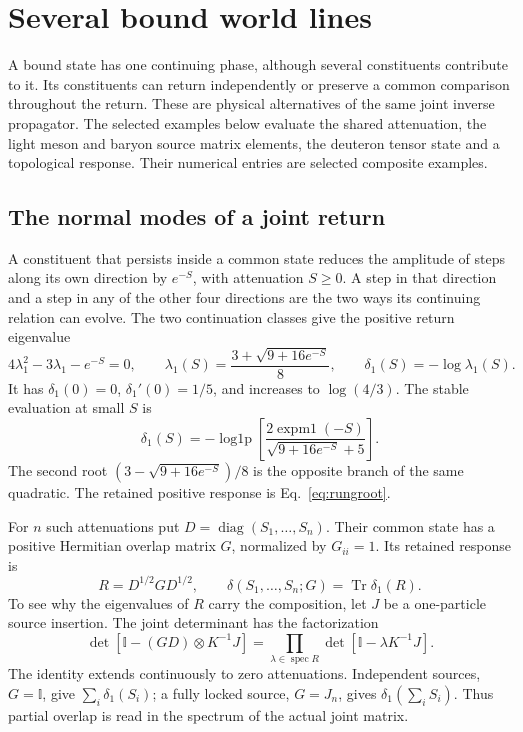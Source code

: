 \documentclass[aps,prx,onecolumn,10pt,notitlepage,nofootinbib,longbibliography]{revtex4-2}
\numberwithin{equation}{section}
\numberwithin{table}{section}
\newcommand{\Id}{\mathbb I}
\newcommand{\Tr}{\operatorname{Tr}}
\newcommand{\diag}{\operatorname{diag}}
\begin{document}
\section{Several bound world lines}
\label{sec:many}


A bound state has one continuing phase, although several constituents contribute to it. Its constituents can return independently or preserve a common comparison throughout the return. These are physical alternatives of the same joint inverse propagator. The selected examples below evaluate the shared attenuation, the light meson and baryon source matrix elements, the deuteron tensor state and a topological response. Their numerical entries are selected composite examples.

\subsection{The normal modes of a joint return}
A constituent that persists inside a common state reduces the amplitude of steps along its own direction by $e^{-S}$, with attenuation $S\geq0$. A step in that direction and a step in any of the other four directions are the two ways its continuing relation can evolve. The two continuation classes give the positive return eigenvalue
\begin{equation}
 4\lambda_1^2-3\lambda_1-e^{-S}=0,\qquad
 \lambda_1(S)=\frac{3+\sqrt{9+16e^{-S}}}{8},\qquad
 \delta_1(S)=-\log\lambda_1(S).
 \label{eq:rungroot}
\end{equation}
It has $\delta_1(0)=0$, $\delta_1'(0)=1/5$, and increases to $\log(4/3)$. The stable evaluation at small $S$ is
\begin{equation}
 \delta_1(S)=
 -\operatorname{log1p}\!\left[
 \frac{2\operatorname{expm1}(-S)}{\sqrt{9+16e^{-S}}+5}\right].
\end{equation}
The second root $(3-\sqrt{9+16e^{-S}})/8$ is the opposite branch of the same quadratic. The retained positive response is Eq.~\eqref{eq:rungroot}.

For $n$ such attenuations put $D=\diag(S_1,\ldots,S_n)$. Their common state has a positive Hermitian overlap matrix $G$, normalized by $G_{ii}=1$. Its retained response is
\begin{equation}
 R=D^{1/2}GD^{1/2},\qquad
 \delta(S_1,\ldots,S_n;G)=\Tr\delta_1(R).
 \label{eq:join}
\end{equation}
To see why the eigenvalues of $R$ carry the composition, let $J$ be a one-particle source insertion. The joint determinant has the factorization
\begin{equation}
 \det[\Id-(GD)\otimes K^{-1}J]
 =\prod_{\lambda\in\operatorname{spec}R}\det[\Id-\lambda K^{-1}J].
 \label{eq:joindet}
\end{equation}
The identity extends continuously to zero attenuations. Independent sources, $G=\Id$, give $\sum_i\delta_1(S_i)$; a fully locked source, $G=J_n$, gives $\delta_1(\sum_iS_i)$. Thus partial overlap is read in the spectrum of the actual joint matrix.
\end{document}
